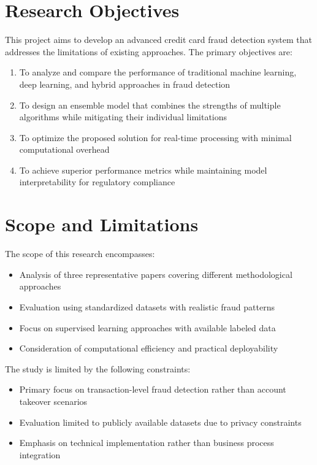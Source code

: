 \section{Research Objectives}

This project aims to develop an advanced credit card fraud detection system that addresses the limitations of existing approaches. The primary objectives are:

\begin{enumerate}
\item To analyze and compare the performance of traditional machine learning, deep learning, and hybrid approaches in fraud detection
    
\item To design an ensemble model that combines the strengths of multiple algorithms while mitigating their individual limitations
    
\item To optimize the proposed solution for real-time processing with minimal computational overhead
    
\item To achieve superior performance metrics while maintaining model interpretability for regulatory compliance
\end{enumerate}

\section{Scope and Limitations}

The scope of this research encompasses:

\begin{itemize}
\item Analysis of three representative papers covering different methodological approaches
\item Evaluation using standardized datasets with realistic fraud patterns
\item Focus on supervised learning approaches with available labeled data
\item Consideration of computational efficiency and practical deployability
\end{itemize}

The study is limited by the following constraints:

\begin{itemize}
\item Primary focus on transaction-level fraud detection rather than account takeover scenarios
\item Evaluation limited to publicly available datasets due to privacy constraints
\item Emphasis on technical implementation rather than business process integration
\end{itemize}

